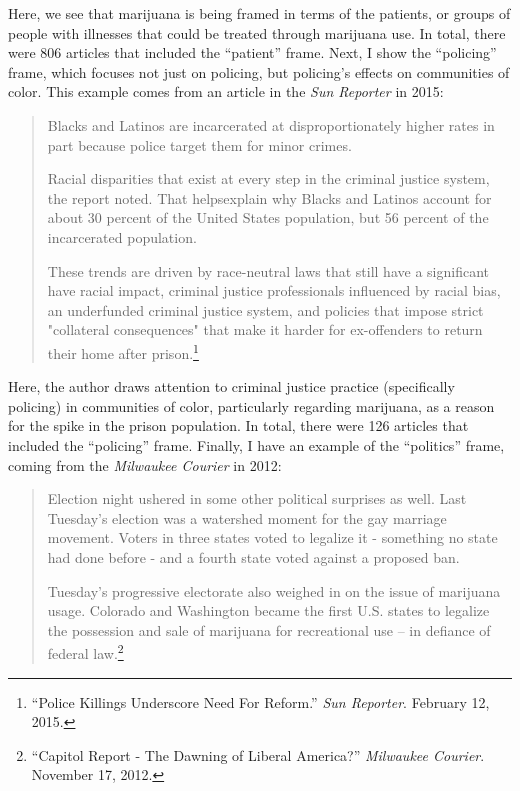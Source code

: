 Here, we see that marijuana is being framed in terms of the patients, or groups of people with illnesses that could be treated through marijuana use. In total, there were 806 articles that included the ``patient'' frame. Next, I show the ``policing'' frame, which focuses not just on policing, but policing's effects on communities of color. This example comes from an article in the \textit{Sun Reporter} in 2015:


\begin{quotation}
\begin{singlespace}
\noindent Blacks and Latinos are incarcerated at disproportionately higher rates in part because police target them for minor crimes. \newline

\noindent Racial disparities that exist at every step in the criminal justice system, the report noted. That helpsexplain why Blacks and Latinos account for about 30 percent of the United States population, but 56 percent of the incarcerated population. \newline


\noindent These trends are driven by race-neutral laws that still have a significant have racial impact, criminal justice professionals influenced by racial bias, an underfunded criminal justice system, and policies that impose strict "collateral consequences" that make it harder for ex-offenders to return their home after prison.\footnote{``Police Killings Underscore Need For Reform.'' \textit{Sun Reporter}. February 12, 2015.}
\end{singlespace}
\end{quotation}

Here, the author draws attention to criminal justice practice (specifically policing) in communities of color, particularly regarding marijuana, as a reason for the spike in the prison population. In total, there were 126 articles that included the ``policing'' frame. Finally, I have an example of the ``politics'' frame, coming from the \textit{Milwaukee Courier} in 2012:


\begin{quotation}
\begin{singlespace}
\noindent Election night ushered in some other political surprises as well. Last Tuesday's election was a watershed moment for the gay marriage movement. Voters in three states voted to legalize it - something no state had done before - and a fourth state voted against a proposed ban.\newline

\noindent Tuesday's progressive electorate also weighed in on the issue of marijuana usage. Colorado and Washington became the first U.S. states to legalize the possession and sale of marijuana for recreational use -- in defiance of federal law.\footnote{``Capitol Report - The Dawning of Liberal America?'' \textit{Milwaukee Courier}. November 17, 2012.}
\end{singlespace}
\end{quotation}

